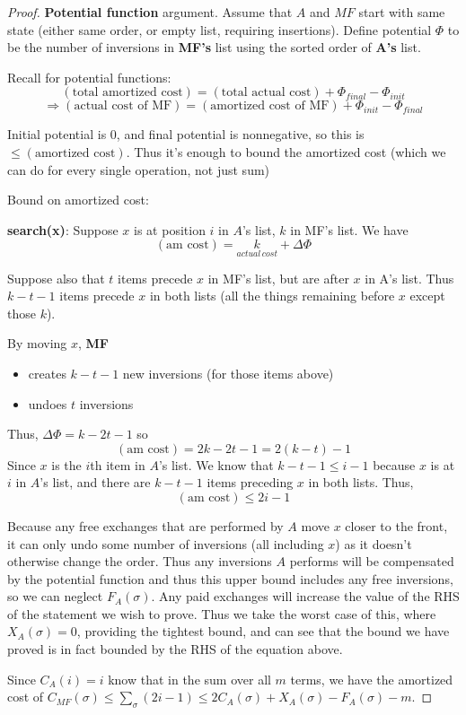\documentclass[11pt]{article}
\begin{document}
\begin{proof}
	{\bf Potential function} argument. Assume that $A$ and $MF$ start with same state (either same order, or empty list, requiring insertions). Define potential $\Phi$ to be the number of inversions in {\bf MF's} list using the sorted order of {\bf A's} list. 

	Recall for potential functions:
	\begin{equation*}
		(\text{total amortized cost}) = (\text{total actual cost}) + \Phi_{final} - \Phi_{init}
	\end{equation*}
	\[
	\Rightarrow (\text{actual cost of MF}) = (\text{amortized cost of MF}) + \Phi_{init} - \Phi_{final}
	\]

	Initial potential is $0$, and final potential is nonnegative, so this is $\leq (\text{amortized cost})$. Thus it's enough to bound the amortized cost (which we can do for every single operation, not just sum)

	Bound on amortized cost:

	{\bf search(x)}:
		Suppose $x$ is at position $i$ in $A$'s list, $k$ in MF's list. We have
		\[
			(\text{am cost}) = \underset{actual\,cost}{k} + \Delta\Phi
			\]

		Suppose also that $t$ items precede $x$ in MF's list, but are after $x$ in A's list. Thus $k-t-1$ items precede $x$ in both lists (all the things remaining before $x$ except those $k$).

		By moving $x$, {\bf MF}
		\begin{itemize}
			\item creates $k-t-1$ new inversions (for those items above)
			\item undoes $t$ inversions
		\end{itemize}

		Thus, $\Delta\Phi = k - 2t - 1$ so
		\[
			(\text{am cost}) = 2k - 2t - 1 = 2(k-t) - 1
		\]
		Since $x$ is the $i$th item in $A$'s list. We know that $k-t-1 \leq i-1$ because $x$ is at $i$ in $A$'s list, and there are $k-t-1$ items preceding $x$ in both lists. Thus, 
		\[
			(\text{am cost}) \leq 2i - 1
		\]
		
		Because any free exchanges that are performed by $A$ move $x$ closer to the front, it can only undo some number of inversions (all including $x$) as it doesn't otherwise change the order. Thus any inversions $A$ performs will be compensated by the potential function and thus this upper bound includes any free inversions, so we can neglect $F_A(\sigma)$. Any paid exchanges will increase the value of the RHS of the statement we wish to prove. Thus we take the worst case of this, where $X_A(\sigma) = 0$, providing the tightest bound, and can see that the bound we have proved is in fact bounded by the RHS of the equation above.

	Since $C_A(i) = i$ know that in the sum over all $m$ terms, we have the amortized cost of $C_{MF}(\sigma) \leq \sum_\sigma (2i - 1) \leq 2C_A(\sigma) + X_A(\sigma) - F_A(\sigma) - m$.

\end{proof}
\end{document}
